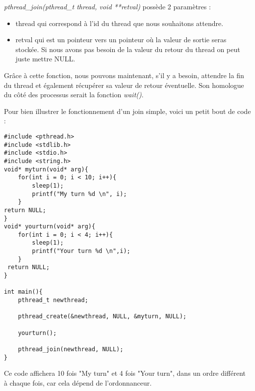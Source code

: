 \textit{pthread\_join(pthread\_t thread, void **retval)} possède 2 paramètres :

\begin{itemize}
    \item thread qui correspond à l'id du thread que nous souhaitons attendre.
    \\
    \item retval qui est un pointeur vers un pointeur où la valeur de sortie seras stockée. Si nous avons pas besoin de la valeur du retour du thread on peut juste mettre NULL.
\end{itemize}
\vspace{\baselineskip}

Grâce à cette fonction, nous pouvons maintenant, s'il y a besoin, attendre la fin du thread et également récupérer sa valeur de retour éventuelle. Son homologue du côté des processus serait la fonction \textit{wait()}.

Pour bien illustrer le fonctionnement d'un join simple, voici un petit bout de code :



\begin{lstlisting}[title = Exemple code join]
#include <pthread.h>
#include <stdlib.h>
#include <stdio.h>
#include <string.h>
void* myturn(void* arg){
	for(int i = 0; i < 10; i++){
		sleep(1);
		printf("My turn %d \n", i);
	}
return NULL;
}
void* yourturn(void* arg){
	for(int i = 0; i < 4; i++){
		sleep(1);
		printf("Your turn %d \n",i);
	}
 return NULL;
}

int main(){
	pthread_t newthread;

	pthread_create(&newthread, NULL, &myturn, NULL);
	
	yourturn();

	pthread_join(newthread, NULL);
}
\end{lstlisting}
\vspace{\baselineskip}

Ce code affichera 10 fois "My turn" et 4 fois "Your turn", dans un ordre différent à chaque fois, car cela dépend de l'ordonnanceur.
